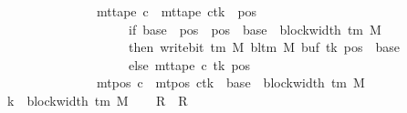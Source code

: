 \begin{isabellebody}
\ \ \ \ \ \ \ \ \ \ \ \ \ \ {\isasymand}\ mt{\isacharunderscore}{\kern0pt}tape\ c{\isacharprime}{\kern0pt}{\isacharprime}{\kern0pt}\ {\isacharequal}{\kern0pt}\ {\isacharparenleft}{\kern0pt}mt{\isacharunderscore}{\kern0pt}tape\ c{\isacharprime}{\kern0pt}{\isacharparenright}{\kern0pt}{\isacharparenleft}{\kern0pt}tk\ {\isacharcolon}{\kern0pt}{\isacharequal}{\kern0pt}\ {\isacharparenleft}{\kern0pt}{\isasymlambda}pos{\isachardot}{\kern0pt}\isanewline
\ \ \ \ \ \ \ \ \ \ \ \ \ \ \ \ \ \ \ \ if\ base\ {\isasymle}\ pos\ {\isasymand}\ pos\ {\isacharless}{\kern0pt}\ base\ {\isacharplus}{\kern0pt}\ block{\isacharunderscore}{\kern0pt}width\ {\isacharparenleft}{\kern0pt}{\isasymGamma}{\isacharunderscore}{\kern0pt}tm\ M{\isacharparenright}{\kern0pt}\isanewline
\ \ \ \ \ \ \ \ \ \ \ \ \ \ \ \ \ \ \ \ then\ write{\isacharunderscore}{\kern0pt}bit\ {\isacharparenleft}{\kern0pt}{\isasymGamma}{\isacharunderscore}{\kern0pt}tm\ M{\isacharparenright}{\kern0pt}\ {\isacharparenleft}{\kern0pt}bl{\isacharunderscore}{\kern0pt}tm\ M{\isacharparenright}{\kern0pt}\ {\isacharparenleft}{\kern0pt}buf\ tk{\isacharparenright}{\kern0pt}\ {\isacharparenleft}{\kern0pt}pos\ {\isacharminus}{\kern0pt}\ base{\isacharparenright}{\kern0pt}\isanewline
\ \ \ \ \ \ \ \ \ \ \ \ \ \ \ \ \ \ \ \ else\ mt{\isacharunderscore}{\kern0pt}tape\ c{\isacharprime}{\kern0pt}\ tk\ pos{\isacharparenright}{\kern0pt}{\isacharparenright}{\kern0pt}\isanewline
\ \ \ \ \ \ \ \ \ \ \ \ \ \ {\isasymand}\ mt{\isacharunderscore}{\kern0pt}pos\ c{\isacharprime}{\kern0pt}{\isacharprime}{\kern0pt}\ {\isacharequal}{\kern0pt}\ {\isacharparenleft}{\kern0pt}mt{\isacharunderscore}{\kern0pt}pos\ c{\isacharprime}{\kern0pt}{\isacharparenright}{\kern0pt}{\isacharparenleft}{\kern0pt}tk\ {\isacharcolon}{\kern0pt}{\isacharequal}{\kern0pt}\ base\ {\isacharplus}{\kern0pt}\ block{\isacharunderscore}{\kern0pt}width\ {\isacharparenleft}{\kern0pt}{\isasymGamma}{\isacharunderscore}{\kern0pt}tm\ M{\isacharparenright}{\kern0pt}{\isacharparenright}{\kern0pt}{\isachardoublequoteclose}\isanewline
%
\isadelimproof
%
\endisadelimproof
%
\isatagproof
{}\isamarkupfalse%
\ {\isacharminus}{\kern0pt}\isanewline
\ \ \isamarkupfalse%
\ {\isacharquery}{\kern0pt}k\ {\isacharequal}{\kern0pt}\ {\isachardoublequoteopen}block{\isacharunderscore}{\kern0pt}width\ {\isacharparenleft}{\kern0pt}{\isasymGamma}{\isacharunderscore}{\kern0pt}tm\ M{\isacharparenright}{\kern0pt}{\isachardoublequoteclose}\isanewline
\ \ \isamarkupfalse%
\ {\isacharquery}{\kern0pt}R\ {\isacharequal}{\kern0pt}\ R{\isacharprime}{\kern0pt}\isanewline

\end{isabellebody}
